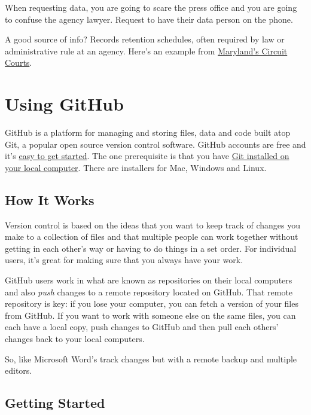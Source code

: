 \documentclass[
  letterpaper,
  DIV=11,
  numbers=noendperiod]{scrreprt}
\begin{document}
When requesting data, you are going to scare the press office and you
are going to confuse the agency lawyer. Request to have their data
person on the phone.

A good source of info? Records retention schedules, often required by
law or administrative rule at an agency. Here's an example from
\href{https://www.courts.state.md.us/sites/default/files/import/circuit/pdfs/retentionschedule_2330.pdf}{Maryland's
Circuit Courts}.


\hypertarget{using-github}{%
\chapter{Using GitHub}\label{using-github}}

GitHub is a platform for managing and storing files, data and code built
atop Git, a popular open source version control software. GitHub
accounts are free and it's
\href{https://docs.github.com/en/get-started/quickstart}{easy to get
started}. The one prerequisite is that you have
\href{https://docs.github.com/en/get-started/quickstart/set-up-git}{Git
installed on your local computer}. There are installers for Mac, Windows
and Linux.

\hypertarget{how-it-works}{%
\section{How It Works}\label{how-it-works}}

Version control is based on the ideas that you want to keep track of
changes you make to a collection of files and that multiple people can
work together without getting in each other's way or having to do things
in a set order. For individual users, it's great for making sure that
you always have your work.

GitHub users work in what are known as repositories on their local
computers and also \emph{push} changes to a remote repository located on
GitHub. That remote repository is key: if you lose your computer, you
can fetch a version of your files from GitHub. If you want to work with
someone else on the same files, you can each have a local copy, push
changes to GitHub and then pull each others' changes back to your local
computers.

So, like Microsoft Word's track changes but with a remote backup and
multiple editors.

\hypertarget{getting-started}{%
\section{Getting Started}\label{getting-started}}
\end{document}
